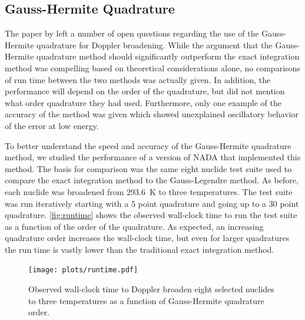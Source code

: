 \documentclass[3p,authoryear]{elsarticle}
\begin{document}
\subsection{Gauss-Hermite Quadrature}

The paper by \citet{nd-dean-2010} left a number of open questions regarding the
use of the Gauss-Hermite quadrature for Doppler broadening. While the argument
that the Gauss-Hermite quadrature method should significantly outperform the
exact integration method was compelling based on theoretical considerations
alone, no comparisons of run time between the two methods was actually given. In
addition, the performance will depend on the order of the quadrature, but
\citet{nd-dean-2010} did not mention what order quadrature they had
used. Furthermore, only one example of the accuracy of the method was given
which showed unexplained oscillatory behavior of the error at low energy.

To better understand the speed and accuracy of the Gauss-Hermite quadrature
method, we studied the performance of a version of NADA that implemented this
method. The basis for comparison was the same eight nuclide test suite used to
compare the exact integration method to the Gauss-Legendre method. As before,
each nuclide was broadened from \SI{293.6}{\kelvin} to three temperatures. The
test suite was run iteratively starting with a 5 point quadrature and going up
to a 30 point quadrature. \autoref{fig:runtime} shows the observed wall-clock
time to run the test suite as a function of the order of the quadrature. As
expected, an increasing quadrature order increases the wall-clock time, but even
for larger quadratures the run time is vastly lower than the traditional exact
integration method.

\begin{figure}[H]
  \centering
  \texttt{[image: plots/runtime.pdf]}
  \caption{Observed wall-clock time to Doppler broaden eight selected nuclides
    to three temperatures as a function of Gauss-Hermite quadrature order.}
  \label{fig:runtime}
\end{figure}
\end{document}
